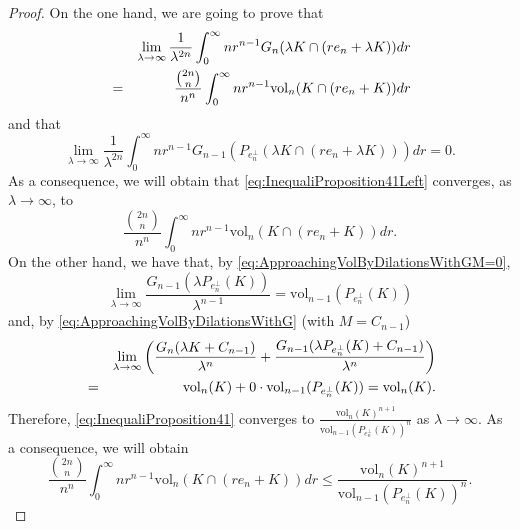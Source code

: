 \documentclass[10pt]{amsart}
\def\vol{\mathrm{vol}}
\numberwithin{equation}{section}
\begin{document}
\begin{proof}
On the one hand, we are going to prove that
\begin{eqnarray}\label{eq:Claim1}
&&\lim_{\lambda\to\infty}\frac{1}{\lambda^{2n}}\int_0^\infty nr^{n-1}G_n(\lambda K\cap(re_n+\lambda K))dr\cr
&=&\frac{{{2n}\choose{n}}}{n^n}\int_0^\infty nr^{n-1}\vol_n( K\cap(re_n+ K))dr
\end{eqnarray}
and that
\begin{equation}\label{eq:Claim2}
\lim_{\lambda\to\infty}\frac{1}{\lambda^{2n}}\int_0^\infty nr^{n-1}G_{n-1}(P_{e_n^\perp}(\lambda K\cap(re_n+\lambda K)))dr=0.
\end{equation}
As a consequence, we will obtain that \eqref{eq:InequaliProposition41Left} converges, as $\lambda\to\infty$, to
$$
\frac{{{2n}\choose{n}}}{n^n}\int_0^\infty nr^{n-1}\vol_n( K\cap(re_n+ K))dr.
$$
On the other hand, we have that, by \eqref{eq:ApproachingVolByDilationsWithGM=0},
$$
\lim_{\lambda\to\infty}\frac{G_{n-1}(\lambda P_{e_n^\perp}(K))}{\lambda^{n-1}}=\vol_{n-1}(P_{e_n^\perp}(K))
$$
and, by \eqref{eq:ApproachingVolByDilationsWithG} (with $M=C_{n-1}$)
\begin{eqnarray*}
&&\lim_{\lambda\to\infty}\left(\frac{G_n(\lambda K+C_{n-1})}{\lambda^n}+\frac{G_{n-1}(\lambda P_{e_n^\perp}(K)+C_{n-1})}{\lambda^n}\right)\cr
&=&\vol_n(K)+0\cdot\vol_{n-1}(P_{e_n^\perp}(K))=\vol_n(K).
\end{eqnarray*}
Therefore, \eqref{eq:InequaliProposition41} converges to $\frac{\vol_n(K)^{n+1}}{\vol_{n-1}(P_{e_n^\perp}(K))^n}$ as $\lambda\to\infty$. As a consequence, we will obtain
$$
\frac{{{2n}\choose{n}}}{n^n}\int_0^\infty nr^{n-1}\vol_n( K\cap(re_n+ K))dr\leq\frac{\vol_n(K)^{n+1}}{\vol_{n-1}(P_{e_n^\perp}(K))^n}.
$$


\end{proof}
\end{document}
